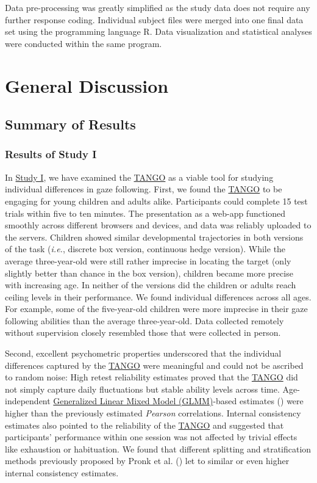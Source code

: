 \documentclass[
]{scrbook}
\begin{document}
Data pre-processing was greatly simplified as the study data does not require any further response coding. Individual subject files were merged into one final data set using the programming language R. Data visualization and statistical analyses were conducted within the same program.

\chapter{General Discussion}\label{discussion}

\section{Summary of Results}\label{summary-of-results}

\subsection{Results of Study I}\label{resultsI}

In \hyperref[studyI]{Study I}, we have examined the \hyperref[acronyms_TANGO]{TANGO} as a viable tool for studying individual differences in gaze following. First, we found the \hyperref[acronyms_TANGO]{TANGO} to be engaging for young children and adults alike. Participants could complete 15 test trials within five to ten minutes. The presentation as a web-app functioned smoothly across different browsers and devices, and data was reliably uploaded to the servers. Children showed similar developmental trajectories in both versions of the task (\emph{i.e.}, discrete box version, continuous hedge version). While the average three-year-old were still rather imprecise in locating the target (only slightly better than chance in the box version), children became more precise with increasing age. In neither of the versions did the children or adults reach ceiling levels in their performance. We found individual differences across all ages. For example, some of the five-year-old children were more imprecise in their gaze following abilities than the average three-year-old. Data collected remotely without supervision closely resembled those that were collected in person.

Second, excellent psychometric properties underscored that the individual differences captured by the \hyperref[acronyms_TANGO]{TANGO} were meaningful and could not be ascribed to random noise: High retest reliability estimates proved that the \hyperref[acronyms_TANGO]{TANGO} did not simply capture daily fluctuations but stable ability levels across time. Age-independent \hyperref[acronyms_GLMM]{Generalized Linear Mixed Model (GLMM)}-based estimates () were higher than the previously estimated \emph{Pearson} correlations. Internal consistency estimates also pointed to the reliability of the \hyperref[acronyms_TANGO]{TANGO} and suggested that participants' performance within one session was not affected by trivial effects like exhaustion or habituation. We found that different splitting and stratification methods previously proposed by Pronk et al. () let to similar or even higher internal consistency estimates.
\end{document}
